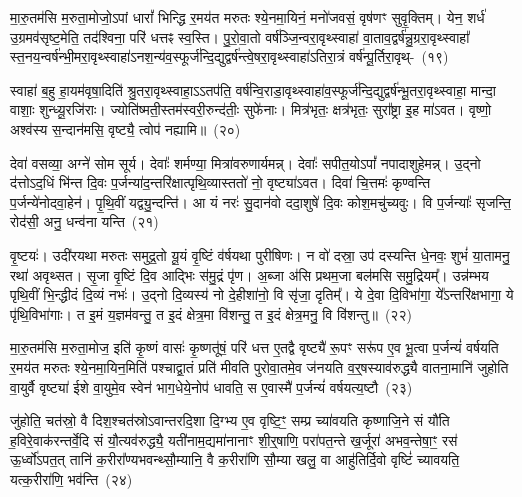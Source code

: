 {\anuvakamend[{अ॒स्मै॒ त ए॒व द्वाद॑श च}]}

मा॒रु॒तम॑सि म॒रुता॒मोजो॒\-ऽपां धारां᳚ भिन्द्धि र॒मय॑त मरुतः श्ये॒न\-मा॒यिनं॒ मनो॑जवसं॒ वृष॑णꣳ सुवृ॒क्तिम्। येन॒ शर्ध॑ उ॒ग्र\-मव॑\-सृष्ट॒मेति॒ तद॑श्विना॒ परि॑ धत्तꣴ स्व॒स्ति। पु॒रो॒\-वा॒तो वर्\mbox{}ष॑ञ्जि॒न्वरा॒\-वृथ्\-स्वाहा॑ वा॒ता\-व॒द्वर्\mbox{}ष॑न्नु॒ग्ररा॒वृथ्\-स्वाहा᳚ स्त॒न\-य॒न्वर्\mbox{}ष॑न्भी॒म\-रा॒\-वृथ्\-स्वाहा॑\-ऽन\-श॒न्य॑व॒\-स्फूर्ज॑न्दि॒द्युद्वर्\mbox{}ष॑न्त्वे॒ष\-रा॒\-वृथ्\-स्वाहा॑\-ऽतिरा॒त्रं वर्\mbox{}ष॑न्पू॒र्तिरा॒वृथ्-~(१९)\ip

स्वाहा॑ ब॒हु हा॒यम॑वृषा॒दिति॑ श्रु॒तरा॒वृथ्\-स्वाहा॒\-ऽऽ\-तप॑ति॒ वर्\mbox{}ष॑न्वि॒राडा॒वृथ्\-स्वाहा॑\-व॒स्फूर्ज॑न्दि॒द्युद्वर्\mbox{}ष॑न्भू॒तरा॒वृथ्\-स्वाहा॒ मान्दा॒ वाशाः॒ शुन्ध्यू॒रजि॑राः। ज्योति॑ष्मती॒स्तम॑स्वरी॒रुन्द॑तीः॒ सुफे॑नाः। मित्र॑भृतः॒ क्षत्र॑भृतः॒ सुरा᳚ष्ट्रा इ॒ह मा॑\-ऽवत। वृष्णो॒ अश्व॑स्य स॒न्दान॑मसि॒ वृष्ट्यै॒ त्वोप॑ नह्यामि॥~(२०)\ip

{\anuvakamend[{पू॒र्तिरा॒वृद्द्विच॑त्वारिꣳशच्च}]}

देवा॑ वसव्या॒ अग्ने॑ सोम सूर्य। देवाः᳚ शर्मण्या॒ मित्रा॑वरुणार्यमन्न्। देवाः᳚ सपीत॒यो\-ऽपां᳚ नपादाशुहेमन्न्। उ॒द्नो द॑त्तो\-ऽद॒धिं भि॑न्त दि॒वः प॒र्जन्या॑\-द॒न्त\-रि॑क्षात्पृथि॒व्यास्ततो॑ नो॒ वृष्ट्या॑\-ऽवत। दिवा॑ चि॒त्तमः॑ कृण्वन्ति प॒र्जन्ये॑नोदवा॒हेन॑। पृ॒थि॒वीं यद्व्यु॒न्दन्ति॑। आ यं नरः॑ सु॒दान॑वो ददा॒शुषे॑ दि॒वः कोश॒मचु॑च्यवुः। वि प॒र्जन्याः᳚ सृजन्ति॒ रोद॑सी॒ अनु॒ धन्व॑ना यन्ति~(२१)\ip

वृ॒ष्टयः॑। उदी॑रयथा मरुतः समुद्र॒तो यू॒यं वृ॒ष्टिं व॑र्\mbox{}षयथा पुरीषिणः। न वो॑ दस्रा॒ उप॑ दस्यन्ति धे॒नवः॒ शुभं॑ या॒तामनु॒ रथा॑ अवृथ्सत। सृ॒जा वृ॒ष्टिं दि॒व आद्भिः स॑मु॒द्रं पृ॑ण। अ॒ब्जा अ॑सि प्रथम॒जा बल॑मसि समु॒द्रियम्᳚। उन्न॑म्भय पृथि॒वीं भि॒न्द्धीदं दि॒व्यं नभः॑। उ॒द्नो दि॒व्यस्य॑ नो दे॒हीशा॑नो॒ वि सृ॑जा॒ दृतिम्᳚। ये दे॒वा दि॒विभा॑गा॒ ये᳚\-ऽन्तरि॑क्षभागा॒ ये पृ॑थि॒विभा॑गाः। त इ॒मं य॒ज्ञम॑वन्तु॒ त इ॒दं क्षेत्र॒मा वि॑शन्तु॒ त इ॒दं क्षेत्र॒मनु॒ वि वि॑शन्तु॥~(२२)\ip

{\anuvakamend[{य॒न्ति॒ दे॒वा विꣳ॑शति॒श्च॑}]}

मा॒रु॒तम॑सि म॒रुता॒मोज॒ इति॑ कृ॒ष्णं वासः॑ कृ॒ष्णतू॑षं॒ परि॑ धत्त ए॒तद्वै वृष्ट्यै॑ रू॒पꣳ सरू॑प ए॒व भू॒त्वा प॒र्जन्यं॑ वर्\mbox{}षयति र॒मय॑त मरुतः श्ये॒नमा॒यिन॒मिति॑ पश्चाद्वा॒तं प्रति॑ मीवति पुरोवा॒तमे॒व ज॑नयति व॒र्॒\mbox{}षस्याव॑रुद्ध्यै वातना॒मानि॑ जुहोति वा॒युर्वै वृष्ट्या॑ ईशे वा॒युमे॒व स्वेन॑ भाग॒\-धेये॒नोप॑ धावति॒ स ए॒वास्मै॑ प॒र्जन्यं॑ वर्\mbox{}षयत्य॒ष्टौ~(२३)\ip

जु॑होति॒ चत॑स्रो॒ वै दिश॒श्चत॑स्रो\-ऽवान्तरदि॒शा दि॒ग्भ्य ए॒व वृष्टि॒ꣳ॒ सम्प्र च्या॑वयति कृष्णाजि॒ने सं यौ॑ति ह॒विरे॒वाक॑रन्तर्वे॒दि सं यौ॒त्यव॑रुद्ध्यै॒ यती॑नाम॒द्यमा॑नानाꣳ शी॒र्॒\mbox{}षाणि॒ परा॑पत॒न्ते ख॒र्जूरा॑ अभव॒न्तेषा॒ꣳ॒ रस॑ ऊ॒र्ध्वो॑\-ऽपत॒त् तानि॑ क॒रीरा᳚ण्यभवन्थ्सौ॒म्यानि॒ वै क॒रीरा॑णि सौ॒म्या खलु॒ वा आहु॑तिर्दि॒वो वृष्टिं॑ च्यावयति॒ यत्क॒रीरा॑णि॒ भव॑न्ति~(२४)\ip

